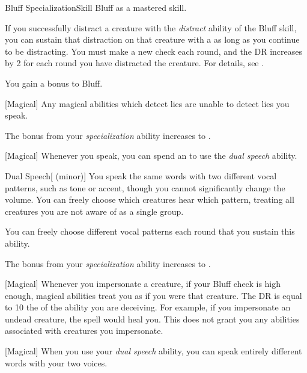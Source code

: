     \begin{feat}{Bluff Specialization}{Skill}
        \featpre Bluff as a mastered skill.

         If you successfully distract a creature with the \textit{distract} ability of the Bluff skill, you can sustain that distraction on that creature with a  as long as you continue to be distracting.
        You must make a new check each round, and the DR increases by 2 for each round you have distracted the creature.
        For details, see .

         You gain a  bonus to Bluff.

        [Magical] Any magical abilities which detect lies are unable to detect lies you speak.

         The bonus from your \textit{specialization} ability increases to .

        [Magical] Whenever you speak, you can spend an  to use the \textit{dual speech} ability.
        \begin{ability}{Dual Speech}[ (minor)]
            You speak the same words with two different vocal patterns, such as tone or accent, though you cannot significantly change the volume.
            You can freely choose which creatures hear which pattern, treating all creatures you are not aware of as a single group.

            You can freely choose different vocal patterns each round that you sustain this ability.
        \end{ability}

         The bonus from your \textit{specialization} ability increases to .

        [Magical] Whenever you impersonate a creature, if your Bluff check is high enough, magical abilities treat you as if you were that creature.
        The DR is equal to 10 \add the  of the ability you are deceiving.
        For example, if you impersonate an undead creature, the  spell would heal you.
        This does not grant you any abilities associated with creatures you impersonate.

        [Magical] When you use your \textit{dual speech} ability, you can speak entirely different words with your two voices.
    \end{feat}

